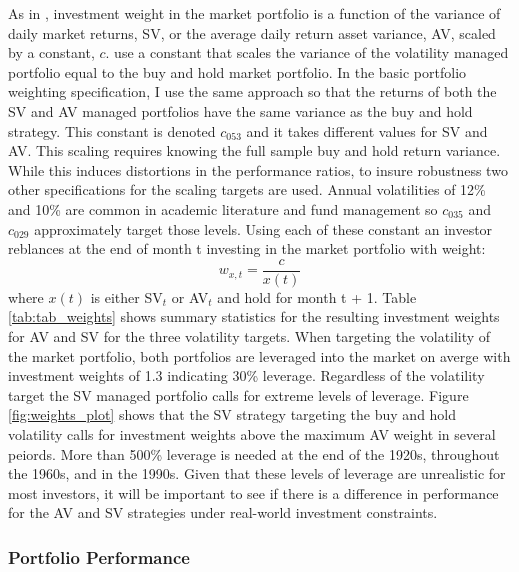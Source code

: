 As in \citet{moreira_volatility-managed_2017}, investment weight in the market portfolio is a function of the variance of daily market returns, SV, or the average daily return asset variance, AV, scaled by a constant, $c$. \citet{moreira_volatility-managed_2017} use a constant that scales the variance of the volatility managed portfolio equal to the buy and hold market portfolio. In the basic portfolio weighting specification, I use the same approach so that the returns of both the SV and AV managed portfolios have the same variance as the buy and hold strategy. This constant is denoted $c_{053}$ and it takes different values for SV and AV. This scaling requires knowing the full sample buy and hold return variance. While this induces distortions in the performance ratios, to insure robustness two other specifications for the scaling targets are used. Annual volatilities of 12\% and 10\% are common in academic literature and fund management so $c_{035}$ and $c_{029}$ approximately target those levels. \citet{barroso_momentum_2015,morrison_guarantees_nodate,verma_volatility-targeting_2018,fleming_economic_nodate,hocquard_constant-volatility_2013} Using each of these constant an investor reblances at the end of month t investing in the market portfolio with weight:
\begin{equation}
	w_{x,t} = \frac{c}{x(t)}
\end{equation} where $x(t)$ is either SV$_{t}$ or AV$_{t}$ and hold for month t + 1. Table \ref{tab:tab_weights} shows summary statistics for the resulting investment weights for AV and SV for the three volatility targets. When targeting the volatility of the market portfolio, both portfolios are leveraged into the market on averge with investment weights of 1.3 indicating 30\% leverage. Regardless of the volatility target the SV managed portfolio calls for extreme levels of leverage. Figure \ref{fig:weights_plot} shows that the SV strategy targeting the buy and hold volatility calls for investment weights above the maximum AV weight in several peiords. More than 500\% leverage is needed at the end of the 1920s, throughout the 1960s, and in the 1990s. Given that these levels of leverage are unrealistic for most investors, it will be important to see if there is a difference in performance for the AV and SV strategies under real-world investment constraints.

\subsubsection{Portfolio Performance}

